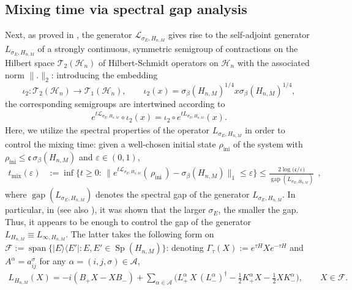 \documentclass[11pt]{amsart}
\newcommand{\1}{\mathbbm{1}}
\newcommand{\cH}{\mathcal{H}}
\theoremstyle{plain}
\theoremstyle{definition}
\theoremstyle{remark}
\numberwithin{equation}{section}
\begin{document}
\subsection{Mixing time via spectral gap analysis}

\noindent Next, as proved in \cite{BeckerRouzeSalzmannToAppearcmp}, the generator $\mathcal L_{\sigma_E,H_{n,M}}$ gives rise to the self-adjoint generator $L_{\sigma_E,H_{n,M}}$ of a strongly continuous, symmetric semigroup of contractions on the Hilbert space $\mathscr{T}_2(\cH_n)$ of Hilbert-Schmidt operators on $\cH_n$ with the associated norm $\|.\|_2$: introducing the embedding
\[
\iota_2:\mathscr T_2(\mathcal H_n)\to \mathscr T_1(\mathcal H_n),
\qquad
\iota_2(x)=\sigma_\beta(H_{n,M})^{1/4}x\sigma_\beta(H_{n,M})^{1/4},
\]
the corresponding semigroups are intertwined according to
\begin{align}
e^{t\mathcal L_{\sigma_E,H_{n,M}}}\circ \iota_2(x)
=
\iota_2\circ e^{tL_{\sigma_E,H_{n,M}}}(x).
\end{align}
 Here, we utilize the spectral properties of the operator $L_{\sigma_E,H_{n,M}}$ in order to control the mixing time: given a well-chosen initial state $\rho_{\operatorname{ini}}$ of the system with $\rho_{\operatorname{ini}}\le \mathfrak{c}\,\sigma_\beta(H_{n,M})$ and $\varepsilon\in (0,1)$,
\begin{align}
t_{\operatorname{mix}}(\varepsilon)&:=\inf\big\{t\ge 0:\,\big\|e^{t\mathcal{L}_{\sigma_E,H_{n,M}}}(\,\rho_{\operatorname{ini}}\,)-\sigma_\beta(H_{n,M})\big\|_1\le \varepsilon\big\}\le  \frac{2\log\big({\mathfrak{c}}/{\varepsilon}\big)}{\operatorname{gap}(L_{\sigma_E,H_{n,M}})}~~,\label{mixingtimeintro}
\end{align}
where $\operatorname{gap}(L_{\sigma_E,H_{n,M}})$ denotes the spectral gap of the generator $L_{\sigma_E,H_{n,M}}$. 
In particular, in \cite[Proposition 4.2]{BeckerRouzeSalzmannToAppearcmp} (see also \cite{slezak2026polynomial}), it was shown that the larger $\sigma_E$, the smaller the gap. Thus, it appears to be enough to control the gap of the generator $L_{H_{n,M}}\equiv L_{\infty,H_{n,M}}$. The latter takes the following form on $\mathscr F:=\operatorname{span}\{|E\rangle\langle E'|:E,E'\in\operatorname{Sp}(H_{n,M})\}$: denoting $\Gamma_\tau(X):=e^{\tau H}Xe^{-\tau H}$ and $A^\alpha=a_{ij}^{\sigma}$ for any $\alpha=(i,j,\sigma)\in\mathcal{A}$,
\begin{align}\label{LHnmgenerator}
L_{H_{n,M}}(X)
=
-i(B_+X-XB_-)
+\sum_{\alpha\in\mathcal A}
\Big(L^\alpha_+\,X\,(L^\alpha_-)^\dagger-\tfrac12 K^\alpha_+X-\tfrac12 XK^\alpha_-\Big),
\qquad X\in\mathscr F.
\end{align}
\end{document}
